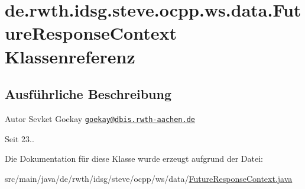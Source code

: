 \hypertarget{classde_1_1rwth_1_1idsg_1_1steve_1_1ocpp_1_1ws_1_1data_1_1_future_response_context}{\section{de.\+rwth.\+idsg.\+steve.\+ocpp.\+ws.\+data.\+Future\+Response\+Context Klassenreferenz}
\label{classde_1_1rwth_1_1idsg_1_1steve_1_1ocpp_1_1ws_1_1data_1_1_future_response_context}
}


\subsection{Ausführliche Beschreibung}
\begin{DoxyAuthor}{Autor}
Sevket Goekay \href{mailto:goekay@dbis.rwth-aachen.de}{\tt goekay@dbis.\+rwth-\/aachen.\+de} 
\end{DoxyAuthor}
\begin{DoxySince}{Seit}
23.. 
\end{DoxySince}


Die Dokumentation für diese Klasse wurde erzeugt aufgrund der Datei\+:\begin{DoxyCompactItemize}
\item 
src/main/java/de/rwth/idsg/steve/ocpp/ws/data/\hyperlink{_future_response_context_8java}{Future\+Response\+Context.\+java}\end{DoxyCompactItemize}
